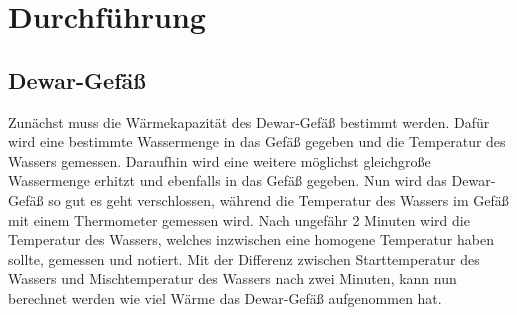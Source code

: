 \section{Durchführung}
\label{sec:Durchführung}

\subsection{Dewar-Gefäß}
Zunächst muss die Wärmekapazität des Dewar-Gefäß bestimmt werden.
Dafür wird eine bestimmte Wassermenge in das Gefäß gegeben und die Temperatur des Wassers gemessen.
Daraufhin wird eine weitere möglichst gleichgroße Wassermenge erhitzt und ebenfalls in das Gefäß gegeben.
Nun wird das Dewar-Gefäß so gut es geht verschlossen, während die Temperatur des Wassers im Gefäß mit einem Thermometer gemessen wird.
Nach ungefähr 2 Minuten wird die Temperatur des Wassers, welches inzwischen eine homogene Temperatur haben sollte, gemessen und notiert.
Mit der Differenz zwischen Starttemperatur des Wassers und Mischtemperatur des Wassers nach zwei Minuten, kann nun berechnet werden wie viel Wärme das Dewar-Gefäß aufgenommen hat.

